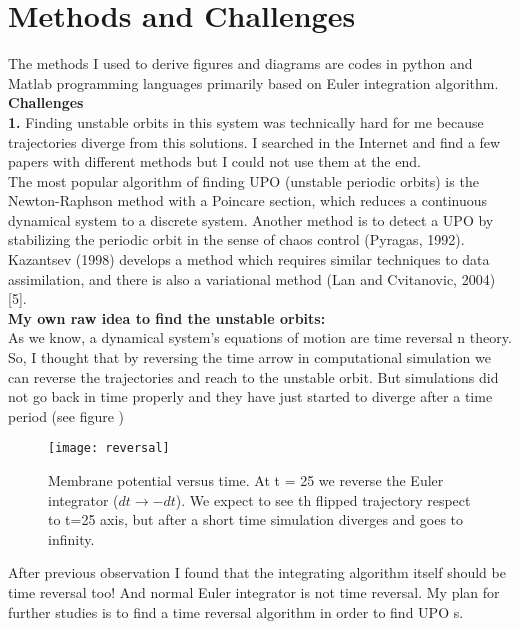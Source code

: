 \documentclass{article}
\begin{document}
	\section{Methods and Challenges}
		The methods I used to derive figures and diagrams are codes in python and Matlab programming languages primarily based on Euler integration algorithm.\\
		
		\textbf{Challenges}\\
		\textbf{1.} Finding unstable orbits in this system was technically hard for me because trajectories diverge from this solutions. I searched in the Internet and find a few papers with different methods but I could not use them at the end. 
		\\
		The most popular algorithm of finding UPO (unstable periodic orbits) is the Newton-Raphson method
		with a Poincare section, which reduces a continuous dynamical system to a discrete system. Another method is to detect a UPO by stabilizing the periodic orbit in the sense of chaos control (Pyragas, 1992). Kazantsev (1998) develops a method which requires similar techniques to data assimilation, and there is also a variational method (Lan and Cvitanovic, 2004) [5].\\
		\textbf{My own raw idea to find the unstable orbits:} \\
		As we know, a dynamical system's equations of motion are time reversal n theory. So, I thought that by reversing the time arrow in computational simulation we can reverse the trajectories and reach to the unstable orbit. But simulations did not go back in time properly and they have just started to diverge after a time period (see figure )	
		  
		
		\begin{figure}[H]
			\centering
			\texttt{[image: reversal]}
			\caption{Membrane potential versus time. At t = 25 we reverse the Euler integrator ($dt \rightarrow -dt$). We expect to see th flipped trajectory respect to t=25 axis, but after a short time simulation diverges and goes to infinity.}
			\label{fig:reversal}
		\end{figure}
		
		After previous observation I found that the integrating algorithm itself should be time reversal too! And normal Euler integrator is not time reversal. My plan for further studies is to find a time reversal algorithm in order to find UPO s.\\
		
\end{document}
